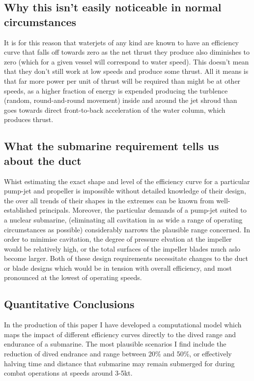 \documentclass{article}\usepackage[]{graphicx}\usepackage[]{color}
\begin{document}
\subsection{Why this isn't easily noticeable in normal circumstances}
It is for this reason that waterjets of any kind are known to have an efficiency curve that falls off towards zero as the net thrust they produce also diminishes to zero (which for a given vessel will correspond to water speed).  This doesn't mean that they don't still work at low speeds and produce some thrust.  All it means is that far more power per unit of thrust will be required than might be at other speeds, as a higher fraction of energy is expended producing the turblence (random, round-and-round movement) inside and around the jet shroud than goes towards direct front-to-back acceleration of the water column, which produces thrust.

\subsection{What the submarine requirement tells us about the duct}
Whist estimating the exact shape and level of the efficiency curve for a particular pump-jet and propeller is impossible without detailed knowledge of their design, the over all trends of their shapes in the extremes can be known from well-established principals.  Moreover, the particular demands of a pump-jet suited to a nuclear submarine, (eliminating all cavitation in as wide a range of operating circumstances as possible) considerably narrows the plausible range concerned.  In order to minimise cavitation, the degree of pressure elvation at the impeller would be relatively high, or the total surfaces of the impeller blades much aslo become larger.  Both of these design requirements necessitate changes to the duct or blade designs which would be in tension with overall efficiency, and most pronounced at the lowest of operating speeds.

\subsection{Quantitative Conclusions}
In the production of this paper I have developed a computational model which maps the impact of different efficiency curves directly to the dived range and endurance of a submarine. The most plausible scenarios I find include the reduction of dived endrance and range between 20\% and 50\%, or effectively halving time and distance that submarine may remain submerged for during combat operations at speeds around 3-5kt.
\end{document}
